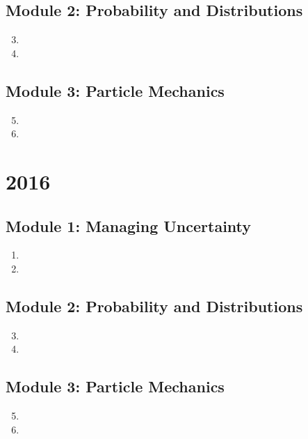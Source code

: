 \documentclass[fleqn,titlepage]{book}
\numberwithin{equation}{section}
\theoremstyle{plain}
\theoremstyle{definition}
\theoremstyle{remark}
\begin{document}
\section{Module 2: Probability and Distributions}
\begin{enumerate}[label=\bfseries  \arabic*.]\setcounter{enumi}{2}
\item 
\item 
\end{enumerate}
\section{Module 3: Particle Mechanics}
\begin{enumerate}[label=\bfseries  \arabic*.]\setcounter{enumi}{4}
\item 
\item 
\end{enumerate}

\chapter{2016}
\section{Module 1: Managing Uncertainty}
\begin{enumerate}[label=\bfseries  \arabic*.]\setcounter{enumi}{0}
\item 
\item 
\end{enumerate}
\section{Module 2: Probability and Distributions}
\begin{enumerate}[label=\bfseries  \arabic*.]\setcounter{enumi}{2}
\item 
\item 
\end{enumerate}
\section{Module 3: Particle Mechanics}
\begin{enumerate}[label=\bfseries  \arabic*.]\setcounter{enumi}{4}
\item 
\item 
\end{enumerate}
\end{document}

